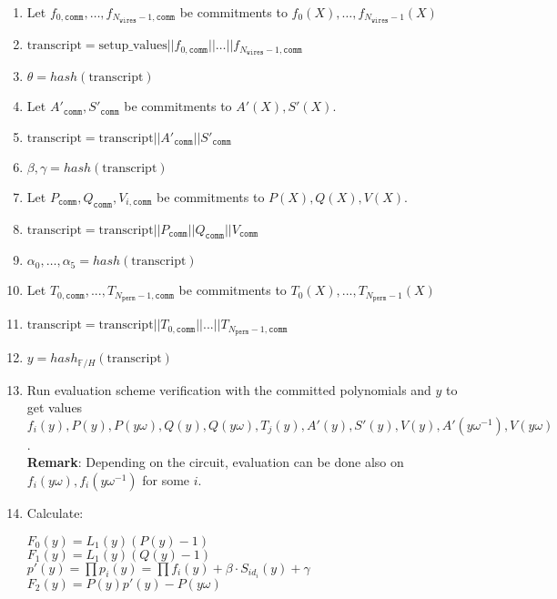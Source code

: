 \begin{enumerate}
    \item Let $f_{0, \texttt{comm}}, \dots, f_{N_{\texttt{wires}} - 1, \texttt{comm}}$ be commitments to $f_{0}(X), \dots, f_{N_{\texttt{wires}} - 1}(X)$
    \item $\text{transcript} = \text{setup\_values} || f_{0, \texttt{comm}} || \dots || f_{N_{\texttt{wires}} - 1, \texttt{comm}}$
    \item $\theta = hash(\text{transcript})$
    \item Let $A'_{\texttt{comm}}, S'_{\texttt{comm}}$ be commitments to $A'(X), S'(X)$.
    \item $\text{transcript} = \text{transcript} || A'_{\texttt{comm}} || S'_{\texttt{comm}}$ 
    \item $\beta, \gamma = hash(\text{transcript})$
    \item Let $P_{\texttt{comm}}, Q_{\texttt{comm}}, V_{i, \texttt{comm}}$ be commitments to $P(X), Q(X), V(X)$.
    \item $\text{transcript} = \text{transcript} || P_{\texttt{comm}} || Q_{\texttt{comm}} || V_{\texttt{comm}}$
    \item $\alpha_0, \dots, \alpha_5 = hash(\text{transcript})$
    \item Let $T_{0, \texttt{comm}}, ..., T_{N_{\texttt{perm}} - 1, \texttt{comm}}$ be commitments to $T_0(X), ..., T_{N_{\texttt{perm}} - 1}(X)$ 
    \item $\text{transcript} = \text{transcript} || T_{0, \texttt{comm}} || ... || T_{N_{\texttt{perm}} - 1, \texttt{comm}}$
    \item $y = hash_{\mathbb{F}/H}(\text{transcript})$
    \item Run evaluation scheme verification with the committed polynomials and $y$ to get values 
        $f_i(y), P(y), P(y\omega), Q(y), Q(y\omega), T_j(y), A'(y), S'(y), V(y), A'(y\omega^{-1}), V(y\omega)$.  \\
        \textbf{Remark}: Depending on the circuit, evaluation can be done also on $f_i(y\omega), f_i(y\omega^{-1})$ for some $i$.
    \item Calculate:
        \begin{center}
            $F_0(y) = L_1(y)(P(y) - 1)$ \\
            $F_1(y) = L_1(y)(Q(y) - 1)$ \\
            $p'(y) = \prod p_i(y) = \prod f_i(y) + \beta \cdot S_{id_i}(y) + \gamma$ \\
            $F_2(y) = P(y)p'(y) - P(y\omega)$ \\

\end{center}
\end{enumerate}
